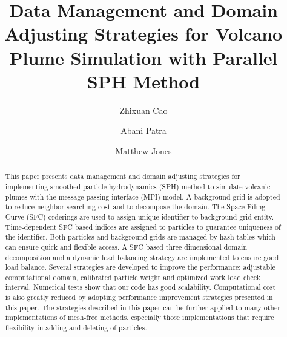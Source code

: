 \documentclass[procedia]{easychair}
\title{Data Management and Domain Adjusting Strategies for Volcano Plume Simulation with Parallel SPH Method}
\author{
    Zhixuan Cao\inst{1}%
\and
    Abani Patra\inst{1}
\and
    Matthew Jones\inst{2}%
}
\institute{
Department of MAE,
University at Buffalo, Buffalo, New York, U.S.A.\\
\and
Center for Computational Research,
University at Buffalo, Buffalo, New York, U.S.A.\\
 }
\begin{document}
\maketitle


\begin{abstract}
This paper presents data management and domain adjusting strategies for implementing smoothed particle hydrodynamics (SPH) method to simulate volcanic plumes with the
message passing interface (MPI) model. 
A background grid is adopted to reduce neighbor searching cost and to decompose the domain. The Space Filing Curve (SFC) orderings are used to assign unique identifier to background grid entity. Time-dependent SFC based indices are assigned to particles to guarantee uniqueness of the identifier.  
Both particles and background grids are managed by hash tables which can ensure quick and flexible access.
A SFC based three dimensional domain decomposition and a dynamic load balancing strategy are implemented to ensure good load balance. 
Several strategies are developed to improve the performance: adjustable computational domain, calibrated particle weight and optimized work load check interval. 
Numerical tests show that our code has good scalability. Computational cost is also greatly reduced by adopting performance improvement strategies presented in this paper. 
The strategies described in this paper can be further applied to many other implementations of mesh-free methods, especially those implementations that require flexibility in adding and deleting of particles.
\end{abstract}


%
%


\end{document}
